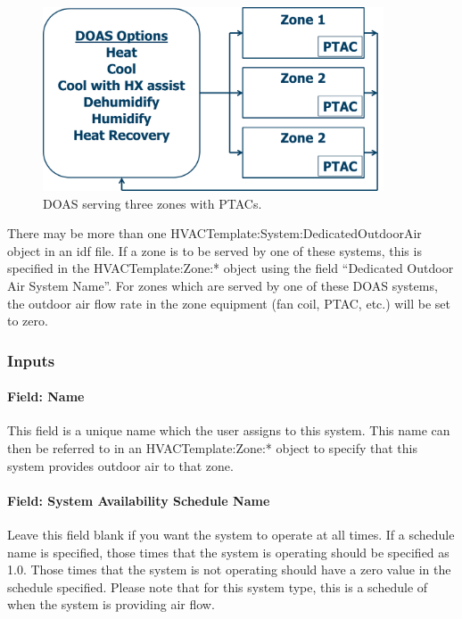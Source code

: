 \begin{figure}[hbtp] %
\centering
\includegraphics[width=0.9\textwidth, height=0.9\textheight, keepaspectratio=true]{media/image614.png}
\caption{DOAS serving three zones with PTACs. \protect \label{fig:doas-serving-three-zones-with-ptacs.}}
\end{figure}

There may be more than one HVACTemplate:System:DedicatedOutdoorAir object in an idf file. If a zone is to be served by one of these systems, this is specified in the HVACTemplate:Zone:* object using the field ``Dedicated Outdoor Air System Name''. For zones which are served by one of these DOAS systems, the outdoor air flow rate in the zone equipment (fan coil, PTAC, etc.) will be set to zero.

\subsubsection{Inputs}\label{inputs-22-001}

\paragraph{Field: Name}\label{field-name-9-007}

This field is a unique name which the user assigns to this system. This name can then be referred to in an HVACTemplate:Zone:* object to specify that this system provides outdoor air to that zone.

\paragraph{Field: System Availability Schedule Name}\label{field-system-availability-schedule-name-14}

Leave this field blank if you want the system to operate at all times. If a schedule name is specified, those times that the system is operating should be specified as 1.0. Those times that the system is not operating should have a zero value in the schedule specified. Please note that for this system type, this is a schedule of when the system is providing air flow.

